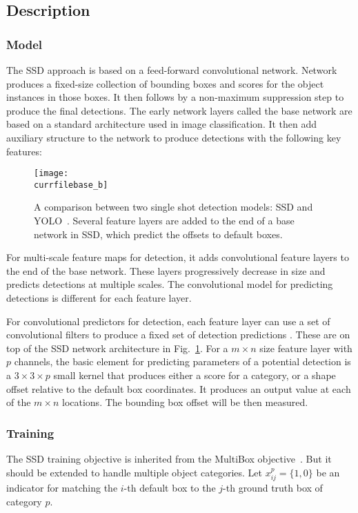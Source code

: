 \documentclass[catalog.tex]{subfiles}
\begin{document}
\subsection*{Description}
\subsubsection{Model}
The SSD approach is based on a feed-forward convolutional network. Network produces a fixed-size collection of bounding boxes and scores for the object instances in those boxes. It then follows by a non-maximum suppression step to produce the final detections. The early network layers called the base network are based on a standard architecture used in image classification. It then add auxiliary structure to the network to produce detections with the following key features:

\begin{figure}
	\centering
	\texttt{[image: \\currfilebase\_b]}
    \caption{A comparison between two single shot detection models: SSD and YOLO~\cite{redmon2015you}. Several feature layers are added to the end of a base network in SSD, which predict the offsets to default boxes.}
    \label{fig:\currfilebase_b}
\end{figure}
\smallskip
For multi-scale feature maps for detection, it adds convolutional feature layers to the end of the base network. These layers progressively decrease in size and predicts detections at multiple scales.  The convolutional model for predicting detections is different for each feature layer.

\smallskip
For convolutional predictors for detection, each feature layer can use a set of convolutional filters to produce a fixed set of detection predictions . These are on top of the SSD network architecture in Fig.~\ref{fig:\currfilebase_b}. For a $m \times n$ size feature layer with $p$ channels, the basic element for predicting parameters of a potential detection is a $3 \times 3 \times p$ small kernel that produces either a score for a category, or a shape offset relative to the default box coordinates. It produces an output value at each of the $m \times n$ locations. The bounding box offset will be then measured.
\subsubsection{Training}
The SSD training objective is inherited from the MultiBox objective~\cite{erhan2014scalable}. But it should be extended to handle multiple object categories. Let $x_{ij}^p = \{1,0\}$ be an indicator for matching the $i$-th default box to the $j$-th ground truth box of category $p$.
\end{document}
